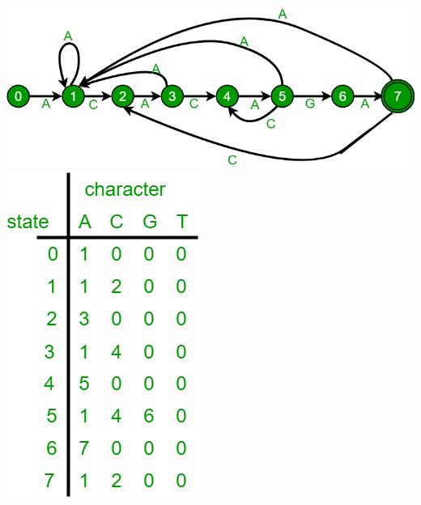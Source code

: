 \documentclass[12pt]{article}
\begin{document}
        \includegraphics[width=\linewidth/2]{autometa1.png}
        \includegraphics[width=\linewidth/5]{autometa2.png}
        
\end{document}
